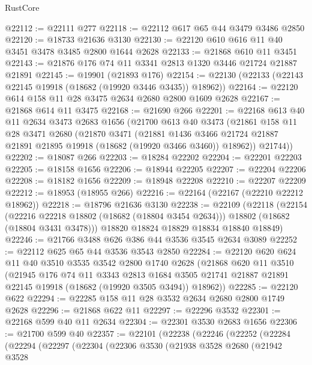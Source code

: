 \begin{lexlean}{RustCore}
\begin{coremodule}
@22112 := @22111 @277
@22118 := @22112 @617 @65 @44 @3479 @3486 @2850
@22120 := @18733 @21636 @3130
@22130 := @22120 @610 @616 @11 @40 @3451 @3478 @3485 @2800 @1644 @2628
@22133 := @21868 @610 @11 @3451
@22143 := @21876 @176 @74 @11 @3341 @2813 @1320 @3446 @21724 @21887 @21891
@22145 := @19901 (@21893 @176)
@22154 := @22130 (@22133 (@22143 @22145 @19918 (@18682 (@19920 @3446 @3435)) @18962))
@22164 := @22120 @614 @158 @11 @28 @3475 @2634 @2680 @2800 @1609 @2628
@22167 := @21868 @614 @11 @3475
@22168 := @21690 @266
@22201 := @22168
    @613
    @40
    @11
    @2634
    @3473
    @2683
    @1656
    (@21700
      @613
      @40
      @3473
      (@21861
        @158
        @11
        @28
        @3471
        @2680
        (@21870
          @3471
          (@21881
            @1436
            @3466
            @21724
            @21887
            @21891
            @21895
            @19918
            (@18682 (@19920 @3466 @3460))
            @18962))
        @21744))
@22202 := @18087 @266
@22203 := @18284 @22202
@22204 := @22201 @22203
@22205 := @18158 @1656
@22206 := @18944 @22205
@22207 := @22204 @22206
@22208 := @18182 @1656
@22209 := @18948 @22208
@22210 := @22207 @22209
@22212 := @18953 (@18955 @266)
@22216 := @22164 (@22167 (@22210 @22212 @18962))
@22218 := @18796 @21636 @3130
@22238 := @22109
    (@22118
      (@22154
        (@22216 @22218 @18802 (@18682 (@18804 @3454 @2634)))
        @18802
        (@18682 (@18804 @3431 @3478)))
      @18820
      @18824
      @18829
      @18834
      @18840
      @18849)
@22246 := @21766 @3488 @626 @386 @44 @3536 @3545 @2634 @3089
@22252 := @22112 @625 @65 @44 @3536 @3543 @2850
@22284 := @22120
    @620
    @624
    @11
    @40
    @3510
    @3535
    @3542
    @2800
    @1740
    @2628
    (@21868
      @620
      @11
      @3510
      (@21945
        @176
        @74
        @11
        @3343
        @2813
        @1684
        @3505
        @21741
        @21887
        @21891
        @22145
        @19918
        (@18682 (@19920 @3505 @3494))
        @18962))
@22285 := @22120 @622
@22294 := @22285 @158 @11 @28 @3532 @2634 @2680 @2800 @1749 @2628
@22296 := @21868 @622 @11
@22297 := @22296 @3532
@22301 := @22168 @599 @40 @11 @2634
@22304 := @22301 @3530 @2683 @1656
@22306 := @21700 @599 @40
@22357 := @22101
    (@22238
      (@22246
        (@22252
          (@22284
            (@22294
              (@22297
                (@22304
                  (@22306
                    @3530
                    (@21938
                      @3528
                      @2680
                      (@21942
                        @3528

\end{coremodule}
\end{lexlean}
